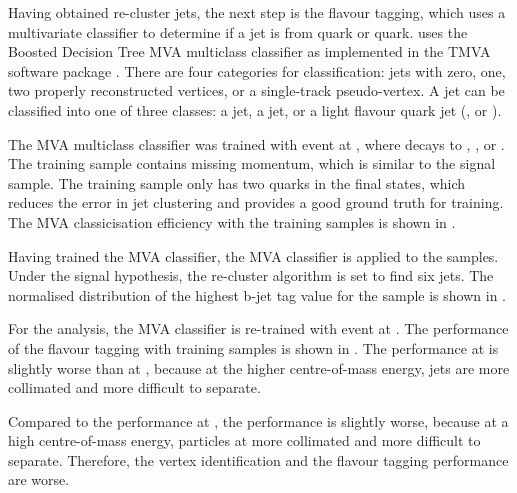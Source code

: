 Having obtained re-cluster jets, the next step is the flavour tagging, which uses a multivariate classifier to determine if a jet is from \Pbottom quark or \Pcharm quark. \lcfiplus uses the Boosted Decision Tree MVA multiclass classifier as implemented in the TMVA software package \cite{Hocker:2007ht}. There are four categories for classification:  jets with zero, one, two properly reconstructed vertices, or a single-track pseudo-vertex. A jet can be classified into one of three classes: a \Pbottom jet, a \Pcharm jet, or a light flavour quark jet (\Pup, \Pdown or \Pstrange).

The MVA multiclass classifier was trained with \HepProcess{\Pep \Pem \to \PZ \APnu \Pnu} event at , where \PZ decays to \HepProcess{\Pbottom\APbottom}, \HepProcess{\Pcharm\APcharm}, or \HepProcess{\Pup\APup/\Pdown\APdown/\Pstrange\APstrange}. The training sample contains missing momentum, which is similar to the signal sample. The training sample only has two quarks in the final states, which reduces the error in jet clustering and provides a good ground truth for training. The MVA classicisation efficiency with the training samples is shown in .

Having trained the MVA classifier, the MVA classifier is applied to the samples. Under the signal hypothesis, the re-cluster algorithm is set to find six jets. The normalised distribution of the highest b-jet tag value for the \eeToHHbbWWHad sample is shown in .

For the  analysis, the MVA classifier is re-trained with  \HepProcess{\Pep \Pem \to \PZ \APnu \Pnu} event at . The performance of the flavour tagging  with training samples is shown in . The performance at  is slightly worse than at , because at the higher centre-of-mass energy, jets are more collimated and more difficult to separate.

Compared to the performance at , the performance is slightly worse, because at a high centre-of-mass energy, particles at more collimated and more difficult to separate. Therefore, the vertex identification and the flavour tagging performance are worse.




